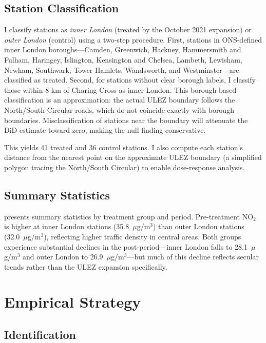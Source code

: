 \documentclass[12pt]{article}
\begin{document}
\subsection{Station Classification}

I classify stations as \textit{inner London} (treated by the October 2021 expansion) or \textit{outer London} (control) using a two-step procedure. First, stations in ONS-defined inner London boroughs---Camden, Greenwich, Hackney, Hammersmith and Fulham, Haringey, Islington, Kensington and Chelsea, Lambeth, Lewisham, Newham, Southwark, Tower Hamlets, Wandsworth, and Westminster---are classified as treated. Second, for stations without clear borough labels, I classify those within 8 km of Charing Cross as inner London. This borough-based classification is an approximation: the actual ULEZ boundary follows the North/South Circular roads, which do not coincide exactly with borough boundaries. Misclassification of stations near the boundary will attenuate the DiD estimate toward zero, making the null finding conservative.

This yields 41 treated and 36 control stations. I also compute each station's distance from the nearest point on the approximate ULEZ boundary (a simplified polygon tracing the North/South Circular) to enable dose-response analysis.

\subsection{Summary Statistics}



 presents summary statistics by treatment group and period. Pre-treatment NO$_2$ is higher at inner London stations (35.8~$\mu$g/m$^3$) than outer London stations (32.0~$\mu$g/m$^3$), reflecting higher traffic density in central areas. Both groups experience substantial declines in the post-period---inner London falls to 28.1~$\mu$g/m$^3$ and outer London to 26.9~$\mu$g/m$^3$---but much of this decline reflects secular trends rather than the ULEZ expansion specifically.


\section{Empirical Strategy}

\subsection{Identification}
\end{document}
